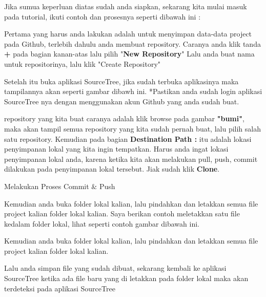 \vspace{12pt}
\noindent 
Jika sumua keperluan diatas sudah anda siapkan, sekarang kita mulai masuk pada tutorial, ikuti contoh dan prosesnya seperti dibawah ini : \par
\vspace{12pt}
\noindent 
Pertama yang harus anda lakukan adalah untuk menyimpan data-data project pada Github, terlebih dahulu anda membuat repository. Caranya anda klik tanda $  $\textbf{+} pada bagian kanan-atas lalu pilih "\textbf{New Repository}" Lalu anda buat nama untuk repositorinya, lalu klik "Create Repository"  \par
\vspace{12pt}
\noindent 
Setelah itu buka aplikasi SourceTree, jika sudah terbuka aplikasinya maka tampilannya akan seperti gambar dibawh ini. *Pastikan anda sudah login aplikasi SourceTree nya dengan menggunakan akun Github yang anda sudah buat. \par
\vspace{12pt}
\noindent 
repository yang kita buat caranya adalah klik browse pada gambar \textbf{"bumi"}, maka akan tampil semua repository yang kita sudah pernah buat, lalu pilih salah satu repository. Kemudian pada bagian \textbf{Destination Path : }itu adalah lokasi penyimpanan lokal yang kita ingin tempatkan.\vspace{\baselineskip}
\vspace{\baselineskip}
Harus anda ingat lokasi penyimpanan lokal anda, karena ketika kita akan melakukan pull, push, commit dilakukan pada penyimpanan lokal tersebut. Jiak sudah klik \textbf{Clone}. \par
\noindent 
Melakukan Proses Commit  $  \&  $ Push \par
\vspace{12pt}
\noindent 
Kemudian anda buka folder lokal kalian, lalu pindahkan dan letakkan semua file project kalian folder lokal kalian. Saya berikan contoh meletakkan satu file kedalam folder lokal, lihat seperti contoh gambar dibawah ini. \par
\vspace{12pt}
\noindent 
Kemudian anda buka folder lokal kalian, lalu pindahkan dan letakkan semua file project kalian folder lokal kalian. \par
\vspace{12pt}
\noindent 
Lalu anda simpan file yang sudah dibuat, sekarang kembali ke aplikasi SourceTree ketika ada file baru yang di letakkan pada folder lokal maka akan terdeteksi pada aplikasi SourceTree \par
